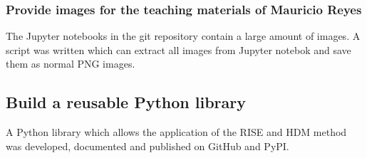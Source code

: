 \subsubsection{Provide images for the teaching materials of Mauricio Reyes}
The Jupyter notebooks in the git repository contain a large amount of images. A script was written which can extract all images from Jupyter notebok
and save them as normal PNG images.

\subsection{Build a reusable Python library}
A Python library which allows the application of the RISE and HDM method was developed, documented and published on GitHub and PyPI.

